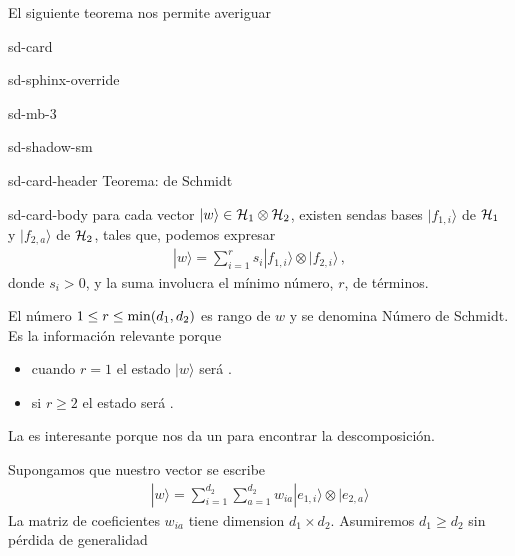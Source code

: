 \documentclass[letterpaper,10pt,english]{jupyterBook}
\newcommand{\ket}[1]{|#1\rangle}
\newcommand{\Hil}{{\cal H}}
\begin{document}
\sphinxAtStartPar
El siguiente teorema nos permite averiguar 

\begin{sphinxuseclass}{sd-card}
\begin{sphinxuseclass}{sd-sphinx-override}
\begin{sphinxuseclass}{sd-mb-3}
\begin{sphinxuseclass}{sd-shadow-sm}
\begin{sphinxuseclass}{sd-card-header}
\sphinxAtStartPar
Teorema: de Schmidt

\end{sphinxuseclass}
\begin{sphinxuseclass}{sd-card-body}
\sphinxAtStartPar
para cada vector \(\ket{w}\in \Hil_1\otimes \Hil_2\), existen sendas  bases  \(\ket{f_{1,i}}\)  de \(\Hil_1\) y  \(\ket{f_{2,a}}\)  de \(\Hil_2\), tales que, podemos expresar
\begin{equation*}
\begin{split}
\ket{w} = \sum_{i=1}^r s_i \ket{f_{1,i}}\otimes\ket{f_{2,i}} \, ,
\end{split}
\end{equation*}
\sphinxAtStartPar
donde \(s_i>0\), y la suma   involucra el mínimo número, \(r\), de términos.

\end{sphinxuseclass}
\end{sphinxuseclass}
\end{sphinxuseclass}
\end{sphinxuseclass}
\end{sphinxuseclass}
\sphinxAtStartPar
El número \(1\leq r\leq {\rm min}(d_1,d_2)\) es rango de \(w\) y  se denomina  Número de Schmidt. Es la información relevante  porque
\begin{itemize}
\item {} 
\sphinxAtStartPar
cuando \(r=1\) el estado \(\ket{w}\) será .

\item {} 
\sphinxAtStartPar
si \(r\geq 2\) el estado será .

\end{itemize}

\sphinxAtStartPar
La  es interesante porque nos da un  para encontrar la descomposición.

\sphinxAtStartPar
Supongamos que nuestro vector se escribe
\begin{equation*}
\begin{split}
\ket{w} = \sum_{i=1}^{d_2}\sum_{a=1}^{d_2} w_{ia} \ket{e_{1,i}}\otimes \ket{e_{2,a}}
\end{split}
\end{equation*}
\sphinxAtStartPar
La matriz de coeficientes \(w_{ia}\) tiene  dimension \(d_1\times d_2\).
Asumiremos \(d_1 \geq d_2\) sin pérdida de generalidad
\end{document}
